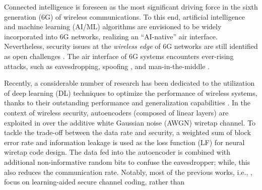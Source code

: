 \documentclass[conference]{IEEEtran}
\begin{document}
Connected intelligence is foreseen  as the most significant driving force in the sixth generation (6G) of wireless communications.  To this end, artificial intelligence and machine learning  (AI/ML) algorithms are envisioned to be widely  incorporated  into  6G  networks, realizing an ``AI-native'' air interface.  
Nevertheless, security issues  at the \emph{wireless edge} of 6G networks are still  identified  as  open challenges \cite{6G-PLS}. 	
	The air interface of  6G  systems encounters   ever-rising   attacks, such as eavesdropping,  spoofing  \cite{WSKG-letter},  and man-in-the-middle  \cite{WSKG-GC}.   
 

	    

	
	Recently, a considerable  number of research has been dedicated to  the utilization of deep learning (DL) techniques 
		to optimize the performance of  wireless  systems,
	thanks to their outstanding performance and generalization capabilities  \cite{DJSCC-Deniz,BW-agile,vtc2022}.  
	In the context of  wireless security,  
 autoencoders (composed of linear layers) are exploited in  \cite{Eduard-AE}  
 over the additive white Gaussian noise (AWGN) wiretap channel.  
	To tackle the trade-off between the data rate and security, 
	a  weighted sum of block error rate and information leakage is used as the loss function (LF) for neural wiretap code design.   
	The data fed into the autoencoder is combined with additional  non-informative random bits 
	to 
	confuse the eavesdropper; while, this  also   reduces the communication  
	rate.   
Notably, most of the previous works, i.e., \cite{MI-estim-channel_coding,MI-Wiretap-estim, Eduard-AE},   focus on  learning-aided secure channel coding, rather than  
\end{document}
